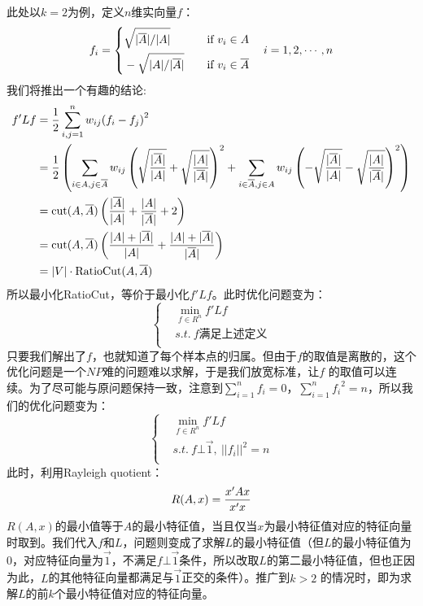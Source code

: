 \documentclass[a4paper, 11pt]{article}
\begin{document}
\begin{CJK*}{GBK}{song}
\quad\quad
此处以$k=2$为例，定义$n$维实向量$f$：
$$f_i=\left\{
\begin{aligned}
&\sqrt {|\overline A |{\rm{/}}|A|} \quad &\text{if} \ v_i \in A\\
&-\sqrt {|A |{\rm{/}}|\overline A|} \quad &\text{if} \ v_i \in \overline A\\
\end{aligned}\right.\quad i=1,2,\cdots,n$$
我们将推出一个有趣的结论:
$$\begin{aligned}
f'Lf &= {1 \over 2}\sum\limits_{i,j = 1}^n {{w_{ij}}{{({f_i} - {f_j})}^2}} \\
&={1 \over 2}\left( {{{\sum\limits_{i \in A,j \in \overline A } {{w_{ij}}\left( {\sqrt {{{|\overline A |} \over {|A|}}}  + \sqrt {{{|A|} \over {|\overline A |}}} } \right)} }^2} + {{\sum\limits_{i \in \overline A ,j \in A} {{w_{ij}}\left( { - \sqrt {{{|\overline A |} \over {|A|}}}  - \sqrt {{{|A|} \over {|\overline A |}}} } \right)} }^2}} \right)\\
&={\rm{cut}}(A,\overline A )\left({{|\overline A |} \over {|A|}} + {{|A|} \over {|\overline A |}} + 2\right)\\
&={\rm{cut}}(A,\overline A )\left({{|A| + |\overline A |} \over {|A|}} + {{|A| + |\overline A |} \over {|\overline A |}}\right)\\
&=|V| \cdot {\rm{RatioCut}}(A,\overline A )
\end{aligned}$$
所以最小化RatioCut，等价于最小化$f'Lf$。此时优化问题变为：
$$\left\{
\begin{aligned}
&\mathop {\min }\limits_{f \in {R^n}} f'Lf\\
&s.t. \ f\text{满足上述定义}\\
\end{aligned}\right.$$
只要我们解出了$f$，也就知道了每个样本点的归属。但由于$f$的取值是离散的，这个优化问题是一个$NP$难的问题难以求解，于是我们放宽标准，让$f$ 的取值可以连续。为了尽可能与原问题保持一致，注意到$\sum\limits_{i = 1}^n {{f_i}}  = 0$，$\sum\limits_{i = 1}^n {{f_i}^2}  = n$，所以我们的优化问题变为：
$$\left\{
\begin{aligned}
&\mathop {\min }\limits_{f \in {R^n}} f'Lf\\
&s.t. \ f \bot \vec 1,\ ||{f_i}|{|^2}=n\\
\end{aligned}\right.$$
此时，利用Rayleigh quotient：
$$R(A,x) = {{x'Ax} \over {x'x}}$$
$R(A,x)$的最小值等于$A$的最小特征值，当且仅当$x$为最小特征值对应的特征向量时取到。我们代入$f$和$L$，问题则变成了求解$L$的最小特征值（但$L$的最小特征值为0，对应特征向量为${\vec 1}$，不满足$f \bot \vec 1$条件，所以改取$L$的第二最小特征值，但也正因为此，$L$的其他特征向量都满足与$\vec 1$正交的条件）。推广到$k>2$ 的情况时，即为求解$L$的前$k$个最小特征值对应的特征向量。


\end{CJK*}
\end{document}
